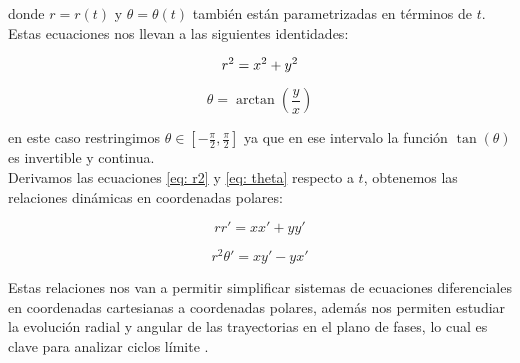 donde $r=r(t)$ y $\theta=\theta(t)$ también están parametrizadas en términos de $t$.\\

Estas ecuaciones nos llevan a las siguientes identidades:

\begin{equation}\label{eq: r2}
	r^2=x^2+y^2\\
\end{equation}

\begin{equation}\label{eq: theta}
	\theta=\arctan{\left(\frac{y}{x}\right)}
\end{equation}

en este caso restringimos $\theta\in\left[-\frac{\pi}{2},\frac{\pi}{2}\right]$ ya que en ese intervalo la función $\tan\left(\theta\right)$ es invertible y continua.\\

Derivamos las ecuaciones \eqref{eq: r2} y \eqref{eq: theta} respecto a $t$, obtenemos las relaciones dinámicas en coordenadas polares:

\begin{equation}\label{eq: drcart}
	rr'=xx'+yy'
\end{equation}

\begin{equation}\label{eq: dthetacart}
	r^2\theta'=xy'-yx'
\end{equation}

Estas relaciones nos van a permitir simplificar sistemas de ecuaciones diferenciales en coordenadas cartesianas a coordenadas polares, además nos permiten estudiar la evolución radial y angular de las trayectorias en el plano de fases, lo cual es clave para analizar ciclos límite \cite{perko2001differential}.\\

\newpage
